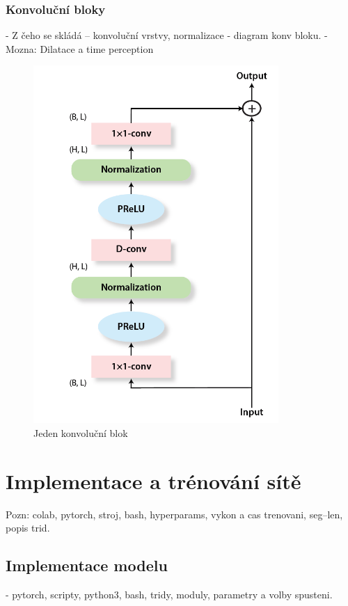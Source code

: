 \subsection{Konvoluční bloky}
- Z čeho se skládá -- konvoluční vrstvy, normalizace
- diagram konv bloku.
- Mozna: Dilatace a time perception
\begin{figure}[H]
    \centering
    \includegraphics[scale=0.5]{obrazky-figures/conv-res-block.png}
    \caption{\label{fig:tasnet-convblock}Jeden konvoluční blok}
\end{figure}





\chapter{Implementace a trénování sítě}
\label{implementace}
Pozn: colab, pytorch, stroj, bash, hyperparams, vykon a cas trenovani, seg--len, popis trid.

\section{Implementace modelu}
- pytorch, scripty, python3, bash, tridy, moduly, parametry a volby spusteni.

